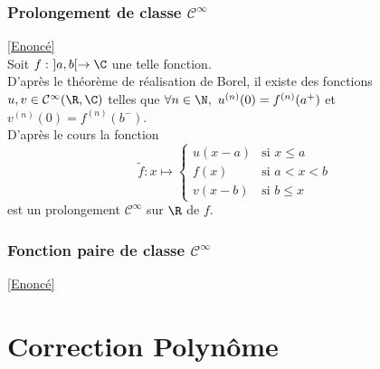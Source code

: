 \documentclass{book}
\begin{document}
	\subsubsection{Prolongement de classe $\mathcal C^\infty$ }
	\label{Prolongement de classe C infini corrigé}
	\textcolor{blue}{\hyperref[Prolongement de classe C infini]{[Enoncé]}}\\
	Soit $f:\ ]a,b[\to \C$ une telle fonction.\\
	D'après le théorème de réalisation de Borel, il existe des fonctions $u,v\in \mathcal C^\infty(\R,\C)$ telles que $\forall n\in \N,\ u^{(n)}(0)=f^{(n)}(a^+)$ et $v^{(n)}(0)=f^{(n)}(b^-)$.\\
	D'après le cours la fonction $$\tilde f:x\mapsto \begin{cases}
		u(x-a)&\mbox{si }x\leq a\\
		f(x)&\mbox{si }a<x<b\\
		v(x-b)&\mbox{si }b\leq x
	\end{cases}$$
	est un prolongement $\mathcal C^\infty$ sur $\R$ de $f$.
	
	\subsubsection{Fonction paire de classe $\mathcal C^\infty$}
	\label{Fonction paire de classe C infini corrigé}
	\textcolor{blue}{\hyperref[Fonction paire de classe C infini]{[Enoncé]}}\\
	
	
	\newpage
\section{Correction Polynôme}
\end{document}
